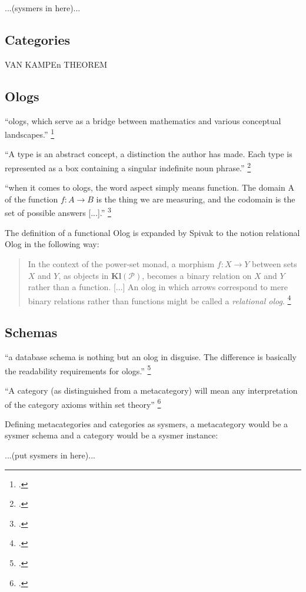 \documentclass[12pt,a4paper, landscape]{article}
\begin{document}
...(sysmers in here)...

\subsection{Categories}

VAN KAMPEn THEOREM

\subsection{Ologs}
``ologs, which serve as a bridge between mathematics and various conceptual landscapes.'' \footcite[24]{Spivak2014}

``A type is an abstract concept, a distinction the author has made. Each type is represented as a box containing a singular indefinite noun phrase.'' \footcite[25]{Spivak2014}

``when it comes to ologs, the word aspect simply means function. The domain A of the function \( f: A \to B \) is the thing we are measuring, and the codomain is the set of possible answers [...].'' \footcite[27]{Spivak2014}

The definition of a functional Olog is expanded by Spivak to the notion relational Olog in the following way:
\begin{quote}
In the context of the power-set monad, a morphism \( f: X \to Y \) between sets \( X \) and \( Y \), as objects in \( \textbf{Kl}(\mathcal{P}) \), becomes a binary relation on \( X \) and \( Y \) rather than a function. [...] An olog in which arrows correspond to mere binary relations rather than functions might 
be called a \textit{relational olog}. \footcite[447]{Spivak2014}
\end{quote}

\subsection{Schemas}
``a database schema is nothing but an olog in disguise. The diﬀerence is basically the readability requirements for ologs.'' \footcite[194]{Spivak2014}

``A category (as distinguished from a metacategory) will mean any interpretation of the category axioms within set theory'' \footcite[10]{MacLane1997}

Defining metacategories and categories as sysmers, a metacategory would be a sysmer schema and a category would be a sysmer instance:

...(put sysmers in here)...
\end{document}
